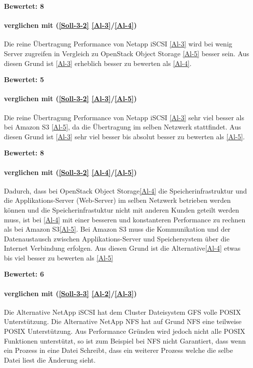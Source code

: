 \textbf{Bewertet: 8}

\paragraph*{  verglichen mit  (\ref{Soll-3-2} \ref{Al-3}/\ref{Al-4})}
Die reine Übertragung Performance von Netapp iSCSI \ref{Al-3} wird bei wenig Server zugreifen in Vergleich zu OpenStack Object Storage \ref{Al-5} besser sein. Aus diesen Grund ist \ref{Al-3} erheblich besser zu bewerten als \ref{Al-4}.

\textbf{Bewertet: 5}

\paragraph*{  verglichen mit  (\ref{Soll-3-2} \ref{Al-3}/\ref{Al-5})}
Die reine Übertragung Performance von Netapp iSCSI \ref{Al-3} sehr viel besser als bei Amazon S3 \ref{Al-5}, da die Übertragung im selben Netzwerk stattfindet. Aus diesen Grund ist \ref{Al-3} sehr viel besser bis absolut besser zu bewerten als \ref{Al-5}.

\textbf{Bewertet: 8}

\paragraph*{  verglichen mit  (\ref{Soll-3-2} \ref{Al-4}/\ref{Al-5})}
Dadurch, dass bei OpenStack Object Storage\ref{Al-4} die Speicherinfrastruktur und die Applikations-Server (Web-Server) im selben Netzwerk betrieben werden können und die Speicherinfrastuktur nicht mit anderen Kunden geteilt werden muss, ist bei \ref{Al-4} mit einer besseren und konstanteren Performance zu rechnen als bei Amazon S3\ref{Al-5}. Bei Amazon S3 muss die Kommunikation und der Datenaustausch zwischen Applikations-Server und Speichersystem über die Internet Verbindung erfolgen. Aus diesen Grund ist die Alternative\ref{Al-4} etwas bis viel besser zu bewerten als \ref{Al-5}

\textbf{Bewertet: 6}


\paragraph*{  verglichen mit  (\ref{Soll-3-3} \ref{Al-2}/\ref{Al-3})}
Die Alternative NetApp iSCSI  hat dem Cluster Dateisystem GFS volle POSIX Unterstützung. Die Alternative NetApp NFS  hat auf Grund NFS eine teilweise POSIX Unterstützung. Aus Performance Gründen wird jedoch nicht alle POSIX Funktionen unterstützt, so ist zum Beispiel bei NFS nicht Garantiert, dass wenn ein Prozess in eine Datei Schreibt, dass ein weiterer Prozess welche die selbe Datei liest die Änderung sieht. \cite{O'Keefe2005}

